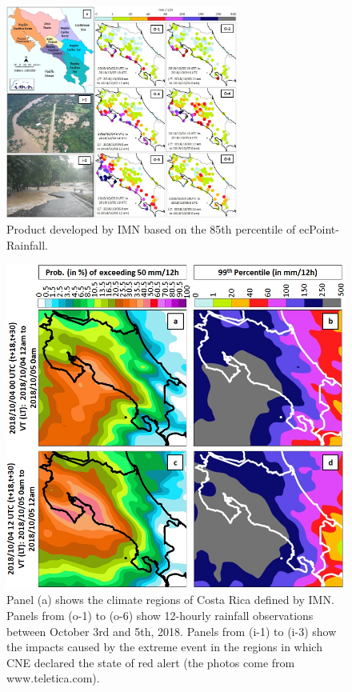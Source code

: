 \documentclass[twocol]{ametsocV5} %
\begin{document}
\begin{figure}
\centerline{\includegraphics[width=18pc]{manuscript/Figures/Fig4.jpg}}
\caption{Product developed by IMN based on the 85th percentile of ecPoint-Rainfall.}
\label{Fig4}
\end{figure}

\begin{figure}
\centerline{\includegraphics[width=39pc]{manuscript/Figures/Fig5.jpg}}
\caption{Panel (a) shows the climate regions of Costa Rica defined by IMN. Panels from (o-1) to (o-6) show 12-hourly rainfall observations between October 3rd and 5th, 2018. Panels from (i-1) to (i-3) show the impacts caused by the extreme event in the regions in which CNE declared the state of red alert (the photos come from www.teletica.com).}
\label{Fig5}
\end{figure}
\end{document}
